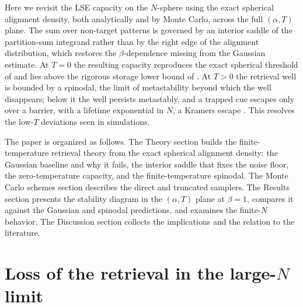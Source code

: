 \documentclass[letterpaper]{article} %
\newcommand{\Bnet}{\beta}
\begin{document}
Here we revisit the LSE capacity on the $N$-sphere using the exact spherical
alignment density, both analytically and by Monte Carlo, across the full
$(\alpha, T)$ plane. The sum over non-target patterns is governed by an interior
saddle of the partition-sum integrand rather than by the right edge of the
alignment distribution, which restores the $\Bnet$-dependence missing from the
Gaussian estimate. At $T = 0$ the resulting capacity reproduces the exact
spherical threshold of \citet{lucibello2024exponential} and lies above the
rigorous storage lower bound of \citet{ramsauer2021hopfield}. At $T > 0$ the
retrieval well is bounded by a spinodal, the limit of metastability beyond which
the well disappears; below it the well persists metastably, and a trapped cue
escapes only over a barrier, with a lifetime exponential in $N$, a Kramers escape
\citep{kramers1940, hanggi1990}. This resolves the low-$T$ deviations seen in
simulations.

The paper is organized as follows. The Theory section builds the
finite-temperature retrieval theory from the exact spherical alignment density:
the Gaussian baseline and why it fails, the interior saddle that fixes the noise
floor, the zero-temperature capacity, and the finite-temperature spinodal. The
Monte Carlo schemes section describes the direct and truncated samplers. The
Results section presents the stability diagram in the $(\alpha, T)$ plane at
$\Bnet = 1$, compares it against the Gaussian and spinodal predictions, and
examines the finite-$N$ behavior. The Discussion section collects the
implications and the relation to the literature.


\section{Loss of the retrieval in the large-$N$ limit}
\end{document}
